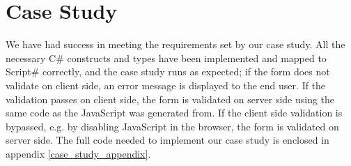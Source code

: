 \section{Case Study} %
\label{sec:reflection_on_case_study}

	We have had success in meeting the requirements set by our case study. All the necessary C\# constructs and types have been implemented and mapped to Script\# correctly, and the case study runs as expected; if the form does not validate on client side, an error message is displayed to the end user. If the validation passes on client side, the form is validated on server side using the same code as the JavaScript was generated from. If the client side validation is bypassed, e.g. by disabling JavaScript in the browser, the form is validated on server side. The full code needed to implement our case study is enclosed in appendix \ref{case_study_appendix}.







